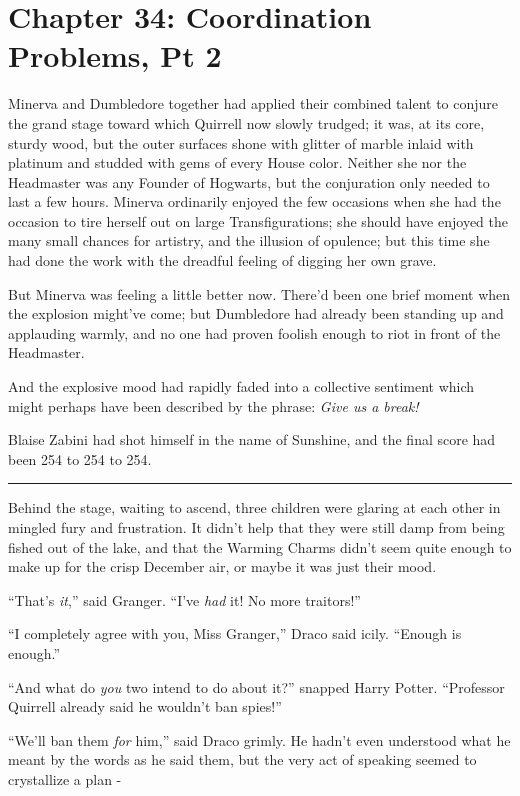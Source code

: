 \chapter{Chapter 34: Coordination Problems, Pt 2}
Minerva and Dumbledore together had applied their combined talent to conjure the grand stage toward which Quirrell now slowly trudged; it was, at its core, sturdy wood, but the outer surfaces shone with glitter of marble inlaid with platinum and studded with gems of every House color. Neither she nor the Headmaster was any Founder of Hogwarts, but the conjuration only needed to last a few hours. Minerva ordinarily enjoyed the few occasions when she had the occasion to tire herself out on large Transfigurations; she should have enjoyed the many small chances for artistry, and the illusion of opulence; but this time she had done the work with the dreadful feeling of digging her own grave.

But Minerva was feeling a little better now. There'd been one brief moment when the explosion might've come; but Dumbledore had already been standing up and applauding warmly, and no one had proven foolish enough to riot in front of the Headmaster.

And the explosive mood had rapidly faded into a collective sentiment which might perhaps have been described by the phrase: \emph{Give us a break!}

Blaise Zabini had shot himself in the name of Sunshine, and the final score had been 254 to 254 to 254.

\begin{center}\rule{3in}{0.4pt}\end{center}

Behind the stage, waiting to ascend, three children were glaring at each other in mingled fury and frustration. It didn't help that they were still damp from being fished out of the lake, and that the Warming Charms didn't seem quite enough to make up for the crisp December air, or maybe it was just their mood.

``That's \emph{it},'' said Granger. ``I've \emph{had} it! No more traitors!''

``I completely agree with you, Miss Granger,'' Draco said icily. ``Enough is enough.''

``And what do \emph{you} two intend to do about it?'' snapped Harry Potter. ``Professor Quirrell already said he wouldn't ban spies!''

``We'll ban them \emph{for} him,'' said Draco grimly. He hadn't even understood what he meant by the words as he said them, but the very act of speaking seemed to crystallize a plan -

